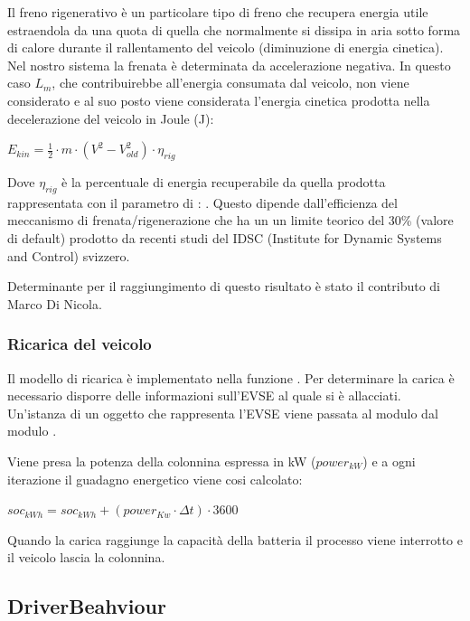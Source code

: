 Il freno rigenerativo è un particolare tipo di freno che recupera energia utile estraendola da una quota di quella che normalmente si dissipa in aria sotto forma di calore durante il rallentamento del veicolo (diminuzione di energia cinetica). Nel nostro sistema la frenata è determinata da accelerazione negativa. In questo caso $L_m$, che contribuirebbe all'energia consumata dal veicolo, non viene considerato e al suo posto viene considerata l'energia cinetica prodotta nella decelerazione del veicolo in Joule (J):

\begin{center}
	$\boxed{E_{kin} = \frac{1}{2} \cdot m \cdot (V^2 - V_{old}^2) \cdot \eta_{rig}}$
\end{center}

Dove $\eta_{rig}$ è la percentuale di energia recuperabile da quella prodotta rappresentata con il parametro di : . Questo dipende dall'efficienza del meccanismo di frenata/rigenerazione che ha un un limite teorico del 30\% (valore di default) prodotto da recenti studi del IDSC (Institute for Dynamic Systems and Control) svizzero.

Determinante per il raggiungimento di questo risultato è stato il contributo di Marco Di Nicola.

\subsubsection{Ricarica del veicolo}

Il modello di ricarica è implementato nella funzione . Per determinare la carica è necessario disporre delle informazioni sull'EVSE al quale si è allacciati. Un'istanza di un oggetto che rappresenta l'EVSE viene passata al modulo  dal modulo .

Viene presa la potenza della colonnina espressa in kW  ($power_{kW}$) e a ogni iterazione il guadagno energetico viene cosi calcolato:

\begin{center}
	$\boxed{soc_{kWh} =  soc_{kWh} + (power_{Kw} \cdot \Delta t) \cdot 3600}$
\end{center}

\noindent
Quando la carica raggiunge la capacità della batteria il processo viene interrotto e il veicolo lascia la colonnina.

\subsection{DriverBeahviour}

